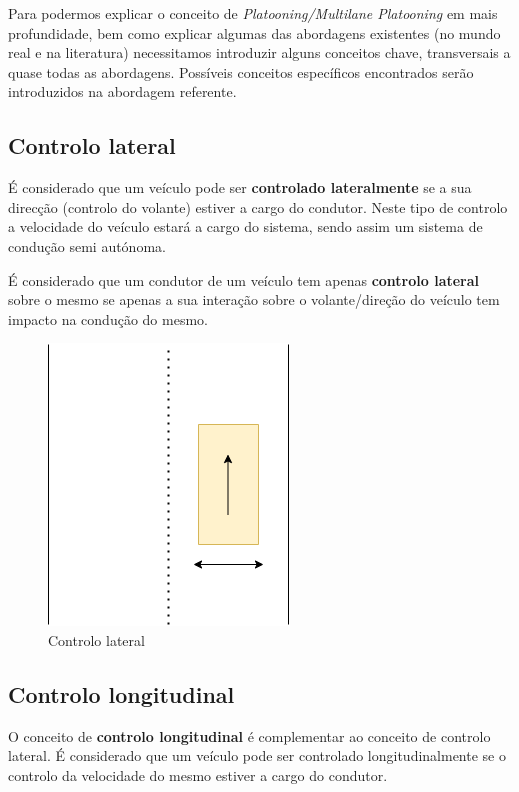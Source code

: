 Para podermos explicar o conceito de \textit{Platooning/Multilane Platooning} em mais profundidade, bem como explicar algumas das abordagens existentes (no mundo real e na literatura) necessitamos introduzir alguns conceitos chave, transversais a quase todas as abordagens. Possíveis conceitos específicos encontrados serão introduzidos na abordagem referente.

\subsection{Controlo lateral}
É considerado que um veículo pode ser \textbf{controlado lateralmente} se a sua direcção (controlo do volante) estiver a cargo do condutor. Neste tipo de controlo a velocidade do veículo estará a cargo do sistema, sendo assim um sistema de condução semi autónoma.

É considerado que um condutor de um  veículo tem apenas \textbf{controlo lateral} sobre o mesmo se apenas a sua interação sobre o volante/direção do veículo tem impacto na condução do mesmo. 
\begin{figure}[H]
    \centering
    \includegraphics[scale=0.4]{LEI - Article/Images/distLateral.png}
    \caption{Controlo lateral}
    \label{fig:my_label}
\end{figure}

\subsection{Controlo longitudinal}
O conceito de \textbf{controlo longitudinal} é complementar ao conceito de controlo lateral. É considerado que um veículo pode ser controlado longitudinalmente se o controlo da velocidade do mesmo estiver a cargo do condutor.

